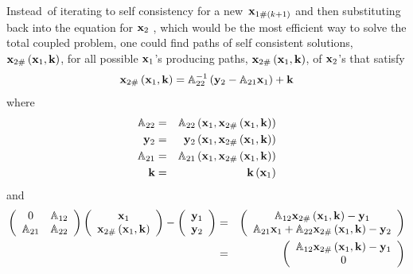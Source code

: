 Instead\ of iterating to self consistency for a new\ ${\bf x}_{1\#\left(
k+1\right) }$ and then substituting back into the equation for ${\bf x}_{2}$%
, which would be the most efficient way to solve the total coupled problem,
one could find paths of self consistent solutions, ${\bf x}_{2\#}\left( {\bf %
x}_{1},{\bf k}\right) $, for all possible ${\bf x}_{1}$'s producing paths, $%
{\bf x}_{2\#}\left( {\bf x}_{1},{\bf k}\right) $, of ${\bf x}_{2}$'s that
satisfy 
\begin{equation}
{\bf x}_{2\#}\left( {\bf x}_{1},{\bf k}\right) ={\Bbb A}_{22}^{-1}\left( 
{\bf y}_{2}-{\Bbb A}_{21}{\bf x}_{1}\right) +{\bf k}
\end{equation}%
where 
\begin{eqnarray}
{\Bbb A}_{22} &=&{\Bbb A}_{22}\left( {\bf x}_{1},{\bf x}_{2\#}\left( {\bf x}%
_{1},{\bf k}\right) \right)  \nonumber \\
{\bf y}_{2} &=&{\bf y}_{2}\left( {\bf x}_{1},{\bf x}_{2\#}\left( {\bf x}_{1},%
{\bf k}\right) \right)  \nonumber \\
{\Bbb A}_{21} &=&{\Bbb A}_{21}\left( {\bf x}_{1},{\bf x}_{2\#}\left( {\bf x}%
_{1},{\bf k}\right) \right)  \nonumber \\
{\bf k} &=&{\bf k}\left( {\bf x}_{1}\right)
\end{eqnarray}%
and 
\begin{eqnarray}
\left( 
\begin{array}{cc}
0 & {\Bbb A}_{12} \\ 
{\Bbb A}_{21} & {\Bbb A}_{22}%
\end{array}%
\right) \left( 
\begin{array}{c}
{\bf x}_{1} \\ 
{\bf x}_{2\#}\left( {\bf x}_{1},{\bf k}\right)%
\end{array}%
\right) -\left( 
\begin{array}{c}
{\bf y}_{1} \\ 
{\bf y}_{2}%
\end{array}%
\right) &=&\left( 
\begin{array}{c}
{\Bbb A}_{12}{\bf x}_{2\#}\left( {\bf x}_{1},{\bf k}\right) -{\bf y}_{1} \\ 
{\Bbb A}_{21}{\bf x}_{1}+{\Bbb A}_{22}{\bf x}_{2\#}\left( {\bf x}_{1},{\bf k}%
\right) -{\bf y}_{2}%
\end{array}%
\right)  \nonumber \\
&=&\left( 
\begin{array}{c}
{\Bbb A}_{12}{\bf x}_{2\#}\left( {\bf x}_{1},{\bf k}\right) -{\bf y}_{1} \\ 
0%
\end{array}%
\right)
\end{eqnarray}%
